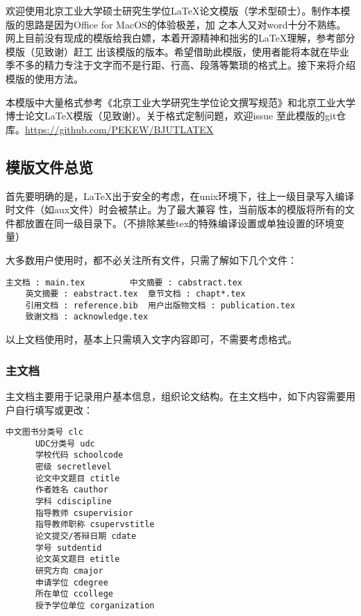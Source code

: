 \label{chap:intro}
\linespread{1.08}\selectfont


欢迎使用北京工业大学硕士研究生学位\LaTeX 论文模版（学术型硕士）。制作本模版的思路是因为Office for MacOS的体验极差，加
之本人又对word十分不熟练。网上目前没有现成的模版给我白嫖，本着开源精神和拙劣的\LaTeX 理解，参考部分模版（见致谢）赶工
出该模版的版本。希望借助此模版，使用者能将本就在毕业季不多的精力专注于文字而不是行距、行高、段落等繁琐的格式上。接下来将介绍模版的使用方法。

本模版中大量格式参考《北京工业大学研究生学位论文撰写规范》和北京工业大学博士论文\LaTeX 模版（见致谢）。关于格式定制问题，欢迎issue 至此模版的git仓库。\uline{https://github.com/PEKEW/BJUTLATEX}



\label{sec:fst}

\subsection{模版文件总览}
首先要明确的是，\LaTeX 出于安全的考虑，在unix环境下，往上一级目录写入编译时文件（如aux文件）时会被禁止。为了最大兼容
性，当前版本的模版将所有的文件都放置在同一级目录下。（不排除某些tex的特殊编译设置或单独设置的环境变量）

大多数用户使用时，都不必关注所有文件，只需了解如下几个文件：

\begin{center}
  \begin{minipage}{0.95\textwidth}
    \begin{Verbatim}[frame=single]
    主文档 : main.tex         中文摘要 : cabstract.tex
    英文摘要 : eabstract.tex  章节文档 : chapt*.tex
    引用文档 : reference.bib  用户出版物文档 : publication.tex
    致谢文档 : acknowledge.tex
    \end{Verbatim}
  \end{minipage}
\end{center}

以上文档使用时，基本上只需填入文字内容即可，不需要考虑格式。

\subsubsection{主文档}


主文档主要用于记录用户基本信息，组织论文结构。在主文档中，如下内容需要用户自行填写或更改：

\begin{center}
  \begin{minipage}{0.65\textwidth}
    \begin{Verbatim}[frame=single]
      中文图书分类号 clc
      UDC分类号 udc
      学校代码 schoolcode
      密级 secretlevel
      论文中文题目 ctitle
      作者姓名 cauthor
      学科 cdiscipline
      指导教师 csupervisior
      指导教师职称 csupervstitle
      论文提交/答辩日期 cdate
      学号 sutdentid
      论文英文题目 etitle
      研究方向 cmajor
      申请学位 cdegree
      所在单位 ccollege
      授予学位单位 corganization
    \end{Verbatim}
  \end{minipage}
\end{center}

